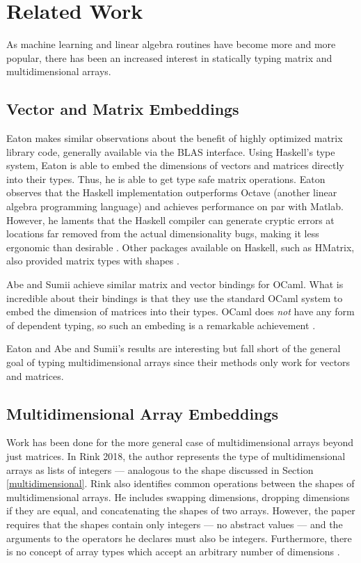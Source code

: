 \documentclass{report}
\begin{document}
\section{Related Work}

As machine learning and linear algebra routines have become more and more popular, there has been an increased interest in statically typing matrix and multidimensional arrays.

\subsection{Vector and Matrix Embeddings}

Eaton makes similar observations about the benefit of highly optimized matrix library code, generally available via the BLAS interface. Using Haskell's type system, Eaton is able to embed the dimensions of vectors and matrices directly into their types. Thus, he is able to get type safe matrix operations. Eaton observes that the Haskell implementation outperforms Octave (another linear algebra programming language) and achieves performance on par with Matlab. However, he laments that the Haskell compiler can generate cryptic errors at locations far removed from the actual dimensionality bugs, making it less ergonomic than desirable \cite{Eaton2006StaticallyTL}. Other packages available on Haskell, such as HMatrix, also provided matrix types with shapes \cite{hmatrix}.

Abe and Sumii achieve similar matrix and vector bindings for OCaml. What is incredible about their bindings is that they use the standard OCaml system to embed the dimension of matrices into their types. OCaml does \textit{not} have any form of dependent typing, so such an embeding is a remarkable achievement \cite{Abe2015ASA}.

Eaton and Abe and Sumii's results are interesting but fall short of the general goal of typing multidimensional arrays since their methods only work for vectors and matrices.

\subsection{Multidimensional Array Embeddings}

Work has been done for the more general case of multidimensional arrays beyond just matrices. In Rink 2018, the author represents the type of multidimensional arrays as lists of integers --- analogous to the shape discussed in Section \ref{multidimensional}. Rink also identifies common operations between the shapes of multidimensional arrays. He includes swapping dimensions, dropping dimensions if they are equal, and concatenating the shapes of two arrays. However, the paper requires that the shapes contain only integers --- no abstract values --- and the arguments to the operators he declares must also be integers. Furthermore, there is no concept of array types which accept an arbitrary number of dimensions \cite{Rink2018ModelingOL}.
\end{document}
